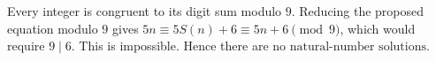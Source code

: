 Every integer is congruent to its digit sum modulo $9$. Reducing the proposed equation modulo $9$ gives $5n\equiv5S(n)+6\equiv5n+6\pmod9$, which would require $9\mid6$. This is impossible. Hence there are $\boxed{\text{no natural-number solutions}}$.
